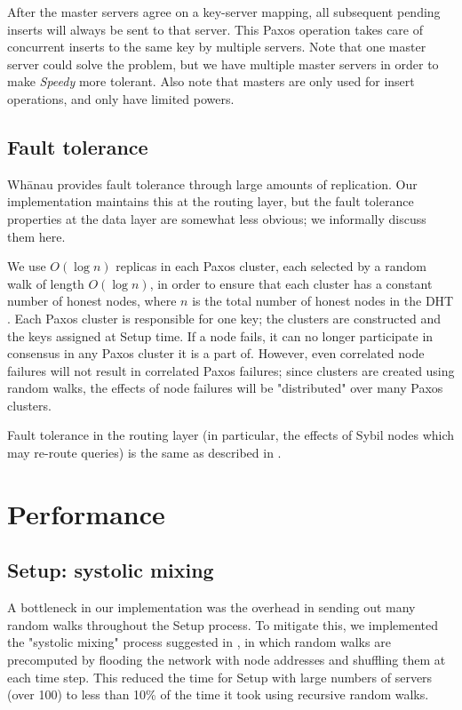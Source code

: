 \documentclass[letter]{article}
\newcommand{\sys}{\textit{Speedy}}
\begin{document}
After the master servers agree on a key-server mapping, all subsequent pending
inserts will always be sent to that server. This Paxos operation takes care of
concurrent inserts to the same key by multiple servers. Note that one master server
could solve the problem, but we have multiple master servers in order to make
\sys{} more tolerant. Also note that masters are only used for insert operations, and
only have limited powers.

\subsection{Fault tolerance}

Wh\={a}nau provides fault tolerance through large amounts of replication. Our
implementation maintains this at the routing layer, but the fault tolerance
properties at the data layer are somewhat less obvious; we informally
discuss them here.

We use $O(\log n)$ replicas in each Paxos cluster, each selected by a random walk
of length $O(\log n)$, in order to ensure that each cluster has a constant
number of honest nodes, where $n$ is the total number of honest nodes in the
DHT \cite{whanauthesis}. Each Paxos cluster is responsible for one key;
the clusters are constructed and the keys assigned at Setup time.
If a node fails, it can no longer participate in consensus in any Paxos
cluster it is a part of. However, even correlated node failures will
not result in correlated Paxos failures; since clusters are created using
random walks, the effects of node failures will be "distributed" over
many Paxos clusters.

Fault tolerance in the routing layer (in particular, the effects of
Sybil nodes which may re-route queries) is the same as described in
\cite{whanau}.

\section{Performance}

\subsection{Setup: systolic mixing}

A bottleneck in our implementation was the overhead in sending out many random
walks throughout the Setup process. To mitigate this, we implemented the "systolic
mixing" process suggested in \cite{whanauthesis}, in which random walks are
precomputed by flooding the network with node addresses and shuffling them at each
time step. This reduced the time for Setup with large numbers of servers (over 100)
to less than 10\% of the time it took using recursive random walks.
\end{document}
